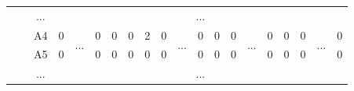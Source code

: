 \documentclass[12pt]{article}
\begin{document}
\begin{table}[H]
{\begin{tabular}{clcccccccccccccccccc}
					   & \multicolumn{1}{l|}{} & \multicolumn{1}{c|}{...}  & \multicolumn{17}{c|}{...}                                                                                                                                                                                                                                                                                                                                                                                                                                                                                                                       \\ \cline{3-4} \cline{6-10} \cline{12-14} \cline{16-18} \cline{20-20} 
					   & \multicolumn{1}{l|}{} & \multicolumn{1}{c|}{A4}   & \multicolumn{1}{c|}{0}    & \multicolumn{1}{c|}{\multirow{2}{*}{...}} & \multicolumn{1}{c|}{0}    & \multicolumn{1}{c|}{0}    & \multicolumn{1}{c|}{0}    & \multicolumn{1}{c|}{2}    & \multicolumn{1}{c|}{0}  & \multicolumn{1}{c|}{\multirow{2}{*}{...}} & \multicolumn{1}{c|}{0}    & \multicolumn{1}{c|}{0}    & \multicolumn{1}{c|}{0}    & \multicolumn{1}{c|}{\multirow{2}{*}{...}} & \multicolumn{1}{c|}{0}  & \multicolumn{1}{c|}{0}  & \multicolumn{1}{c|}{0}  & \multicolumn{1}{c|}{\multirow{2}{*}{...}} & \multicolumn{1}{c|}{0}  \\ \cline{3-4} \cline{6-10} \cline{12-14} \cline{16-18} \cline{20-20} 
					   & \multicolumn{1}{l|}{} & \multicolumn{1}{c|}{A5}   & \multicolumn{1}{c|}{0}    & \multicolumn{1}{c|}{}                     & \multicolumn{1}{c|}{0}    & \multicolumn{1}{c|}{0}    & \multicolumn{1}{c|}{0}    & \multicolumn{1}{c|}{0}    & \multicolumn{1}{c|}{0}  & \multicolumn{1}{c|}{}                     & \multicolumn{1}{c|}{0}    & \multicolumn{1}{c|}{0}    & \multicolumn{1}{c|}{0}    & \multicolumn{1}{c|}{}                     & \multicolumn{1}{c|}{0}  & \multicolumn{1}{c|}{0}  & \multicolumn{1}{c|}{0}  & \multicolumn{1}{c|}{}                     & \multicolumn{1}{c|}{0}  \\ \cline{3-4} \cline{6-10} \cline{12-14} \cline{16-18} \cline{20-20} 
					   & \multicolumn{1}{l|}{} & \multicolumn{1}{c|}{...}  & \multicolumn{17}{c|}{...}                                                                                                                                                                                                                                                                                                                                                                                                                                                                                                                       \\ \cline{3-4} \cline{6-10} \cline{12-14} \cline{16-18} \cline{20-20} 

\end{tabular}}
\end{table}
\end{document}

